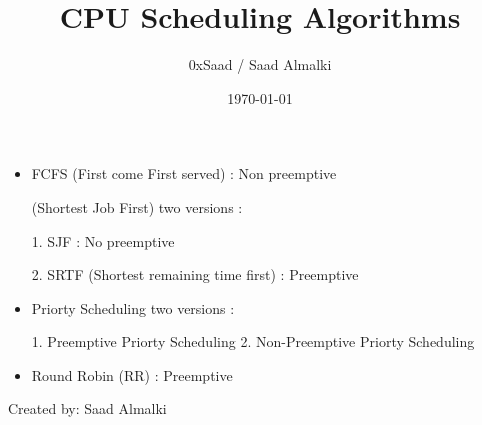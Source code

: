 \documentclass[12pt]{article}
\title{CPU Scheduling Algorithms}
\author{0xSaad / Saad Almalki}
\date{\today}
\begin{document}
\maketitle

\begin{itemize}
    \item FCFS (First come First served) : Non preemptive

  \itemSJF (Shortest Job First) two versions :

1. SJF : No preemptive

2. SRTF (Shortest remaining time first) : Preemptive

  \item Priorty Scheduling two versions :

1. Preemptive Priorty Scheduling
2. Non-Preemptive Priorty Scheduling

  \item Round Robin (RR) : Preemptive
\end{itemize}


\begin{flushright}
Created by: Saad Almalki \\
\end{flushright}
\end{document}
